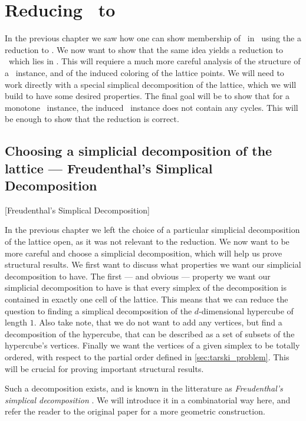 \setchapterpreamble[u]{\margintoc}
\chapter{Reducing \Tarski\ to \EOPL}

In the previous chapter we saw how one can show membership of \Tarski\ in \PPAD\ using the a reduction to \Sperner. We now want to show that the same idea yields a reduction to \EndOfPotentialLine\ which lies in \EOPL. This will requiere a much more careful analysis of the structure of a \Tarski\ instance, and of the induced coloring of the lattice points. We will need to work directly with a special simplical decomposition of the lattice, which we will build to have some desired properties. The final goal will be to show that for a monotone \Tarski\ instance, the induced \EndOfLine\ instance does not contain any cycles. This will be enough to show that the reduction is correct.

\section{Choosing a simplicial decomposition of the lattice --- Freudenthal's Simplical Decomposition}[Freudenthal's Simplical Decomposition]

In the previous chapter we left the choice of a particular simplicial decomposition of the lattice open, as it was not relevant to the reduction. We now want to be more careful and choose a simplicial decomposition, which will help us prove structural results. We first want to discuss what properties we want our simplicial decomposition to have. The first --- and obvious --- property we want our simplicial decomposition to have is that every simplex of the decomposition is contained in exactly one cell of the lattice. This means that we can reduce the question to finding a simplical decomposition of the $d$-dimensional hypercube of length $1$. Also take note, that we do not want to add any vertices, but find a decomposition of the hypercube, that can be described as a set of subsets of the hypercube's vertices.	Finally we want the vertices of a given simplex to be totally ordered, with respect to the partial order defined in \cref{sec:tarski_problem}. This will be crucial for proving important structural results.

Such a decomposition exists, and is known in the litterature as \textit{Freudenthal's simplical decomposition} . We will introduce it in a combinatorial way here, and refer the reader to the original paper for a more geometric construction.

